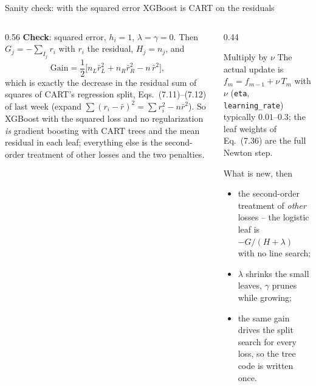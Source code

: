 \documentclass[10pt,aspectratio=169]{beamer}
\begin{document}
\begin{frame}{Sanity check: with the squared error XGBoost is CART on the residuals}
\begin{columns}[T]
\begin{column}{0.56\textwidth}
\footnotesize
\textbf{Check}: squared error, $h_i=1$, $\lambda=\gamma=0$.  Then
$G_j=-\sum_{I_j}r_i$ with $r_i$ the residual, $H_j=n_j$, and
\[
\mathrm{Gain}=\frac12\Big[n_L\bar r_L^2+n_R\bar r_R^2-n\,\bar r^2\Big],\tag{7.38}
\]
which is exactly the decrease in the residual sum of squares of CART's
regression split, Eqs.\ (7.11)--(7.12) of last week (expand
$\sum(r_i-\bar r)^2=\sum r_i^2-n\bar r^2$).  So XGBoost with the squared
loss and no regularization \emph{is} gradient boosting with CART trees and
the mean residual in each leaf; everything else is the second-order
treatment of other losses and the two penalties.
\end{column}
\begin{column}{0.44\textwidth}
\begin{block}{Multiply by $\nu$}
\footnotesize
The actual update is $f_m=f_{m-1}+\nu\,T_m$ with $\nu$ (\texttt{eta},
\texttt{learning\_rate}) typically $0.01$--$0.3$; the leaf weights of Eq.\
(7.36) are the full Newton step.
\end{block}
\begin{block}{What is new, then}
\footnotesize
\begin{itemize}
  \item the second-order treatment of \emph{other} losses -- the logistic
    leaf is $-G/(H+\lambda)$ with no line search;
  \item $\lambda$ shrinks the small leaves, $\gamma$ prunes while growing;
  \item the same gain drives the split search for every loss, so the tree
    code is written once.
\end{itemize}
\end{block}
\end{column}
\end{columns}
\end{frame}
\end{document}
